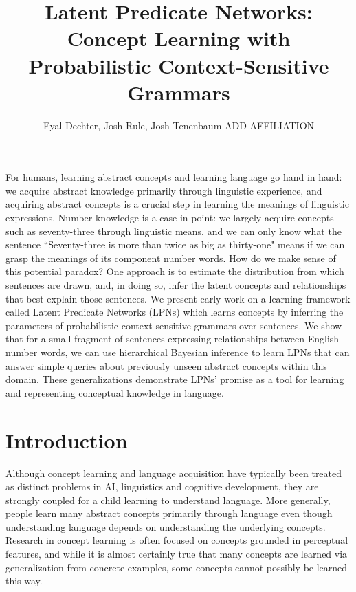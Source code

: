 \documentclass[10pt, twocolumn]{article}
\title{Latent Predicate Networks: Concept Learning with Probabilistic Context-Sensitive Grammars}
\author{Eyal Dechter, Josh Rule, Josh Tenenbaum ADD AFFILIATION}
\date{}
\begin{document}
\vspace{-10cm}
\maketitle
\vspace{-2em}

{\small For humans, learning abstract concepts and learning language
  go hand in hand: we acquire abstract knowledge primarily through
  linguistic experience, and acquiring abstract concepts is a crucial
  step in learning the meanings of linguistic expressions. Number
  knowledge is a case in point: we largely acquire concepts such as
  seventy-three through linguistic means, and we can only know what
  the sentence ``Seventy-three is more than twice as big as
  thirty-one" means if we can grasp the meanings of its component
  number words. How do we make sense of this potential paradox? One
  approach is to estimate the distribution from which sentences are
  drawn, and, in doing so, infer the latent concepts and relationships
  that best explain those sentences. We present early work on a
  learning framework called Latent Predicate Networks (LPNs) which
  learns concepts by inferring the parameters of probabilistic
  context-sensitive grammars over sentences.  We show that for a small
  fragment of sentences expressing relationships between English
  number words, we can use hierarchical Bayesian inference to learn
  LPNs that can answer simple queries about previously unseen abstract
  concepts within this domain. These generalizations demonstrate LPNs'
  promise as a tool for learning and representing conceptual knowledge
  in language.}

\section{Introduction}

Although concept learning and language acquisition have typically been
treated as distinct problems in AI, linguistics and cognitive
development, they are strongly coupled for a child learning to
understand language. More generally, people learn many abstract
concepts primarily through language even though understanding language
depends on understanding the underlying concepts. Research in concept
learning is often focused on concepts grounded in perceptual features,
and while it is almost certainly true that many concepts are learned
via generalization from concrete examples, some concepts cannot
possibly be learned this way.
\end{document}
